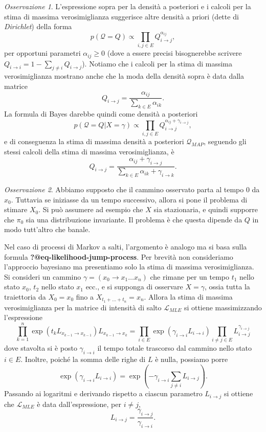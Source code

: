 \documentclass[
  italian,
  letterpaper,
]{book}
\newcommand{\bra}[1]{\left( #1 \right)}
\theoremstyle{definition}
\theoremstyle{remark}
\newtheorem*{remark}{Osservazione}
\begin{document}
\begin{remark}
L'espressione sopra per la densità a posteriori e i calcoli per la stima
di massima verosimiglianza suggerisce altre densità a priori (dette di
\emph{Dirichlet}) della forma
\[ p(\mathcal{Q}= Q) \propto \prod_{i,j \in E} Q_{i\to j}^{\alpha_{ij}},\]
per opportuni parametri \(\alpha_{ij}\ge 0\) (dove a essere precisi
bisognerebbe scrivere \(Q_{i \to i} = 1- \sum_{j \neq i} Q_{i \to j}\)).
Notiamo che i calcoli per la stima di massima verosimiglianza mostrano
anche che la moda della densità sopra è data dalla matrice
\[ Q_{i \to j} = \frac{ \alpha_{ij}}{\sum_{k \in E} \alpha_{ik}}.\] La
formula di Bayes darebbe quindi come densità a posteriori
\[ p(\mathcal{Q}= Q | X = \gamma ) \propto \prod_{i,j \in E} Q_{i\to j}^{\alpha_{ij} +\gamma_{i \to j}},\]
e di conseguenza la stima di massima densità a posteriori
\(\mathcal{Q}_{MAP}\), seguendo gli stessi calcoli della stima di
massima verosimiglianza, è
\[ Q_{i \to j} =\frac{  \alpha_{ij}+\gamma_{i \to j}}{ \sum_{k \in E} \alpha_{ik} + \gamma_{i \to k}}.\]
\end{remark}

\begin{remark}
Abbiamo supposto che il cammino osservato parta al tempo \(0\) da
\(x_0\). Tuttavia se iniziasse da un tempo successivo, allora si pone il
problema di stimare \(X_0\). Si può assumere ad esempio che \(X\) sia
stazionaria, e quindi supporre che \(\pi_0\) sia una distribuzione
invariante. Il problema è che questa dipende da \(Q\) in modo tutt'altro
che banale.
\end{remark}

Nel caso di processi di Markov a salti, l'argomento è analogo ma si basa
sulla formula \textbf{?@eq-likelihood-jump-process}. Per brevità non
consideriamo l'approccio bayesiano ma presentiamo solo la stima di
massima verosimiglianza. Si consideri un cammino
\(\gamma = (x_0\to x_1 \ldots x_n)\) che rimane per un tempo \(t_1\)
nello stato \(x_0\), \(t_2\) nello stato \(x_1\) ecc., e si supponga di
osservare \(X = \gamma\), ossia tutta la traiettoria da \(X_0 = x_0\)
fino a \(X_{t_1+\ldots +t_n} = x_n\). Allora la stima di massima
verosimiglianza per la matrice di intensità di salto
\(\mathcal{L}_{MLE}\) si ottiene massimizzando l'espressione
\[ \prod_{k=1}^n \exp\bra{t_k L_{x_{k-1} \to x_{k-1}}}  L_{x_{k-1} \to x_k} = \prod_{i \in E}  \exp\bra{\gamma_{i \to i} L_{i\to i} } \prod_{ i\neq j \in E} L_{i\to j}^{\gamma_{i \to j}}\]
dove stavolta si è posto \(\gamma_{i \to i}\) il tempo totale trascorso
dal cammino nello stato \(i \in E\). Inoltre, poiché la somma delle
righe di \(L\) è nulla, possiamo porre
\[ \exp\bra{\gamma_{i \to i} L_{i\to i} } =  \exp\bra{- \gamma_{i \to i} \sum_{j \neq i} L_{i\to j} }.\]
Passando ai logaritmi e derivando rispetto a ciascun parametro
\(L_{i \to j}\) si ottiene che \(\mathcal{L}_{MLE}\) è data
dall'espressione, per \(i \neq j\),
\[  L_{i \to j} = \frac{ \gamma_{i \to j}}{\gamma_{i \to i} }.\]
\end{document}
